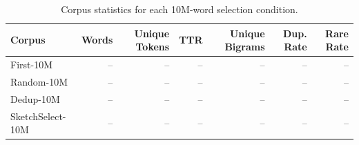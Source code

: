 \begin{table}[t]
\centering
\small
\begin{tabular}{lrrrrrr}
\toprule
\textbf{Corpus} & \textbf{Words} & \textbf{Unique Tokens} & \textbf{TTR} & \textbf{Unique Bigrams} & \textbf{Dup. Rate} & \textbf{Rare Rate} \\
\midrule
First-10M & -- & -- & -- & -- & -- & -- \\
Random-10M & -- & -- & -- & -- & -- & -- \\
Dedup-10M & -- & -- & -- & -- & -- & -- \\
SketchSelect-10M & -- & -- & -- & -- & -- & -- \\
\bottomrule
\end{tabular}
\caption{Corpus statistics for each 10M-word selection condition.}
\label{tab:corpus-stats}
\end{table}
